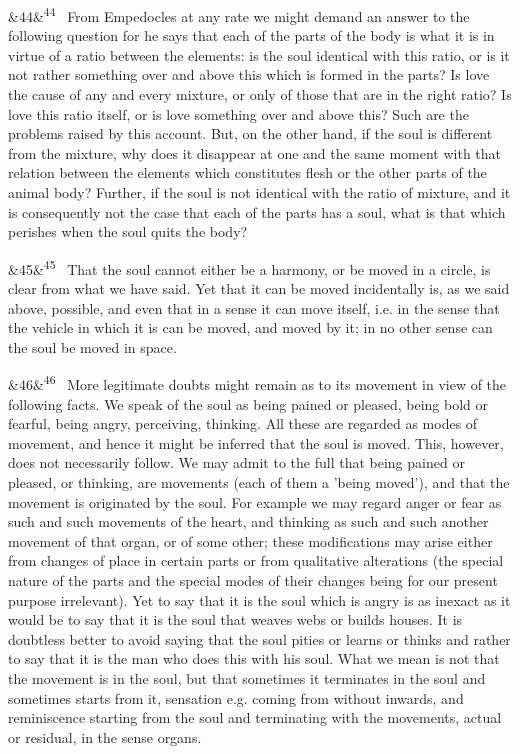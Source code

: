 \documentclass[12pt]{article}
\newcommand{\para}[1][]{\par\noindent\ifx&#1&\else\textsuperscript{\footnotesize #1}~\fi}
\begin{document}
\para[44] From Empedocles at any rate we might demand an answer to the following question for he says that each of the parts of the body is what it is in virtue of a ratio between the elements: is the soul identical with this ratio, or is it not rather something over and above this which is formed in the parts? Is love the cause of any and every mixture, or only of those that are in the right ratio? Is love this ratio itself, or is love something over and above this? Such are the problems raised by this account. But, on the other hand, if the soul is different from the mixture, why does it disappear at one and the same moment with that relation between the elements which constitutes flesh or the other parts of the animal body? Further, if the soul is not identical with the ratio of mixture, and it is consequently not the case that each of the parts has a soul, what is that which perishes when the soul quits the body?

\para[45] That the soul cannot either be a harmony, or be moved in a circle, is clear from what we have said. Yet that it can be moved incidentally is, as we said above, possible, and even that in a sense it can move itself, i.e. in the sense that the vehicle in which it is can be moved, and moved by it; in no other sense can the soul be moved in space.

\para[46] More legitimate doubts might remain as to its movement in view of the following facts. We speak of the soul as being pained or pleased, being bold or fearful, being angry, perceiving, thinking. All these are regarded as modes of movement, and hence it might be inferred that the soul is moved. This, however, does not necessarily follow. We may admit to the full that being pained or pleased, or thinking, are movements (each of them a 'being moved'), and that the movement is originated by the soul. For example we may regard anger or fear as such and such movements of the heart, and thinking as such and such another movement of that organ, or of some other; these modifications may arise either from changes of place in certain parts or from qualitative alterations (the special nature of the parts and the special modes of their changes being for our present purpose irrelevant). Yet to say that it is the soul which is angry is as inexact as it would be to say that it is the soul that weaves webs or builds houses. It is doubtless better to avoid saying that the soul pities or learns or thinks and rather to say that it is the man who does this with his soul. What we mean is not that the movement is in the soul, but that sometimes it terminates in the soul and sometimes starts from it, sensation e.g. coming from without inwards, and reminiscence starting from the soul and terminating with the movements, actual or residual, in the sense organs.
\end{document}
